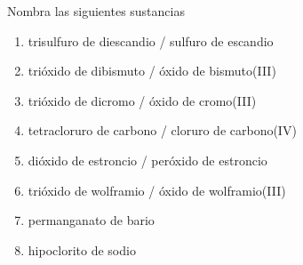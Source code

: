 \begin{exercise}[
    tags    = {inorgánica,nomenclatura,múltiple,2B},
    topics  = {química inorgánica,formulación,nomenclatura},
    source  = {Química 2B SAN 2016, p372, e11},
  ]
  Nombra las siguientes sustancias

  \begin{enumerate}\begin{multicols}{2}
    \item {}
    \item {}
    \item {}
    \item {}
    \item {}
    \item {}
    \item {}
    \item {}
  \end{multicols}\end{enumerate}
\end{exercise}

\begin{solution}
  \begin{enumerate}
    \item trisulfuro de diescandio / sulfuro de escandio
    \item trióxido de dibismuto / óxido de bismuto(III)
    \item trióxido de dicromo / óxido de cromo(III)
    \item tetracloruro de carbono / cloruro de carbono(IV)
    \item dióxido de estroncio / peróxido de estroncio
    \item trióxido de wolframio / óxido de wolframio(III)
    \item permanganato de bario
    \item hipoclorito de sodio
  \end{enumerate}
\end{solution}
